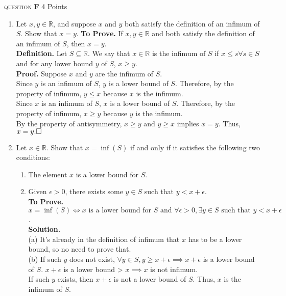 \documentclass[11pt]{article}
\newcommand{\problem
}[2]{
\begin{mdframed}
    \textsc{question} \textbf{#1} \hfill #2
\end{mdframed}
}
\begin{document}
\newpage
\problem{F}{4 Points}
\begin{enumerate}
	\item Let $x, y \in \mathbb{R}$, and suppose $x$ and $y$ both satisfy the definition of an infimum of $S$. Show that $x=y$.
	      \textbf{To Prove.} If $x, y \in \mathbb{R}$ and both satisfy the definition of an infimum of $S$, then $x=y$.\\
	      \textbf{Definition.} Let $S \subseteq \mathbb{R}$. We say that $x \in \mathbb{R}$ is the infimum of $S$ if $x \leq s  \forall s \in S$ and for any lower bound $y$ of $S$, $x \geq y$.\\
	      \textbf{Proof.} Suppose $x$ and $y$ are the infimum of $S$.
	      \\ Since $y$ is an infimum of $S$, $y$ is a lower bound of $S$. Therefore, by the property of infimum, $y\leq x$ because $x$ is the infimum.
	      \\ Since $x$ is an infimum of $S$, $x$ is a lower bound of $S$. Therefore, by the property of infimum, $x \geq y$ because $y$ is the infimum.
	      \\ By the property of antisymmetry, $x \geq y$ and $y \geq x$ implies $x = y$. Thus, $x = y.
		      \\\square$


	\item Let $x \in \mathbb{R}$. Show that $x=\inf (S)$ if and only if it satisfies the following two conditions:

	      \begin{enumerate}
		      \item The element $x$ is a lower bound for $S$.
		      \item Given $\epsilon>0$, there exists some $y \in S$ such that $y<x+\epsilon$.
		            \\\textbf{To Prove.} $x=\inf (S) \iff  x \text{ is a lower bound for } S \text{ and } \forall \epsilon > 0, \exists y \in S \text{ such that } y < x + \epsilon$.
		            \\
		            \textbf{Solution.} \\
		            (a) It's already in the definition of infimum that $x$ has to be a lower bound, so no need to prove that.
		            \\
		            (b) If such $y$ does not exist, $\forall y \in S, y \geq x + \epsilon \implies x + \epsilon$ is a lower bound of $S$. $x+\epsilon$ is a lower bound > $x \implies x$ is not infimum.
		            \\
		            If such $y$ exists, then $x + \epsilon$ is not a lower bound of $S$. Thus, $x$ is the infimum of $S$.



\end{enumerate}
\end{enumerate}
\end{document}

